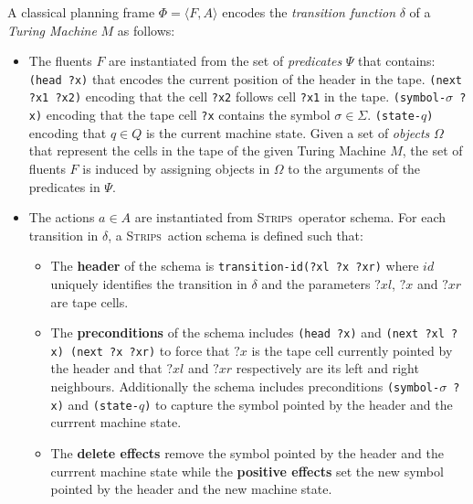 \documentclass[letterpaper]{article} %
\newcommand{\tup}[1]{{\langle #1 \rangle}}
\newcommand{\strips}{\textsc{Strips}}     %
\begin{document}
A classical planning frame $\Phi=\tup{F,A}$ encodes the {\em transition function} $\delta$ of a {\em Turing Machine} $M$ as follows:
\begin{itemize}
\item The fluents $F$ are instantiated from the set of {\em predicates} $\Psi$ that contains: {\small\tt (head ?x)} that encodes the current position of the header in the tape. {\small\tt (next ?x1 ?x2)} encoding that the cell {\tt ?x2} follows cell {\tt ?x1} in the tape. {\small\tt (symbol-$\sigma$ ?x)} encoding that the tape cell {\tt ?x} contains the symbol $\sigma\in\Sigma$. {\small\tt (state-$q$)} encoding that $q\in Q$ is the current machine state. Given a set of {\em objects} $\Omega$ that represent the cells in the tape of the given Turing Machine $M$, the set of fluents $F$ is induced by assigning objects in $\Omega$ to the arguments of the predicates in $\Psi$.
\item The actions $a\in A$ are instantiated from \strips\ operator schema. For each transition in $\delta$, a \strips\ action schema is defined such that:
\begin{itemize}
\item The {\bf header} of the schema is {\small\tt transition-id(?xl ?x ?xr)} where $id$ uniquely identifies the transition in $\delta$ and the parameters $?xl$, $?x$ and $?xr$ are tape cells.
\item The {\bf preconditions} of the schema includes {\small\tt(head ?x)} and {\small\tt (next ?xl ?x) (next ?x ?xr)} to force that $?x$ is the tape cell currently pointed by the header and that $?xl$ and $?xr$ respectively are its left and right neighbours. Additionally the schema includes preconditions {\small\tt(symbol-$\sigma$ ?x)} and {\small\tt (state-$q$)} to capture the symbol pointed by the header and the currrent machine state.
\item The {\bf delete effects} remove the symbol pointed by the header and the currrent machine state while the {\bf positive effects} set the new symbol pointed by the header and the new machine state.
\end{itemize}
\end{itemize}
\end{document}
